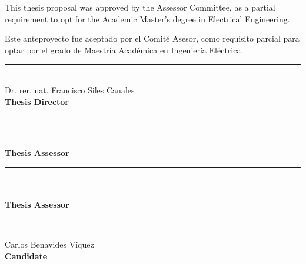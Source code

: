 \documentclass[../tesis.tex]{subfiles}
\begin{document}
\begin{singlespace}
    \begin{center}
        This thesis proposal was approved by the Assessor Committee, as a partial requirement to opt for the
        Academic Master’s degree in Electrical Engineering.

        Este anteproyecto fue aceptado por el Comité Asesor, como requisito parcial para optar por el grado
        de Maestría Académica en Ingeniería Eléctrica.

        \vspace{2cm}

        \rule{7.5cm}{0.2mm}\\
        Dr. rer. nat. Francisco Siles Canales\\
        \textbf{Thesis Director}\\
        \vspace{1.75cm}

        \rule{7.5cm}{0.2mm}\\ \relax
        [TBD]\\
        \textbf{Thesis Assessor}\\
        \vspace{1.75cm}

        \rule{7.5cm}{0.2mm}\\ \relax
        [TBD]\\
        \textbf{Thesis Assessor}\\
        \vspace{1.75cm}

        \rule{7.5cm}{0.2mm}\\
        Carlos Benavides Víquez\\
        \textbf{Candidate}
        
    \end{center}
\end{singlespace}
\newpage
\end{document}
